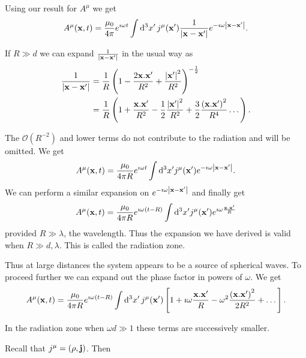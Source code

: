 \documentclass{notes}
\newcommand{\cO}{\mathcal{O}}
\newcommand{\jc}{\vect{j}}
\begin{document}
\vspace{1.5in}

Using our result for $A^\mu$ we get
\[
A^\mu(\mathbf{x},t) = \frac{\mu_0}{4 \pi} e^{\imath \omega t}
\int \mathrm{d}^3 x'\, j^\mu(\mathbf{x}') \frac{1}{\left|\mathbf{x} - \mathbf{x}'\right|}
e^{-\imath \omega \left|\mathbf{x}-\mathbf{x}'\right|}.
\]

If $R \gg d$ we can expand $\frac{1}{\left|\mathbf{x}-\mathbf{x}'\right|}$ in the
usual way as
\begin{align*}
\frac{1}{\left|\mathbf{x}-\mathbf{x}'\right|} &= \frac{1}{R}
\left( 1 - \frac{2 \mathbf{x}.\mathbf{x}'}{R^2}
+ \frac{\left|\mathbf{x}'\right|^2}{R^2} \right)^{-\frac{1}{2}} \\
&= \frac{1}{R} \left( 1 + \frac{\mathbf{x}.\mathbf{x}'}{R^2} - \frac{1}{2}
\frac{\left|\mathbf{x}'\right|^2}{R^2}
+ \frac{3}{2} \frac{\left(\mathbf{x}.\mathbf{x}' \right)^2}{R^4} \dots \right).
\end{align*}

The $\cO(R^{-2})$ and lower terms do not contribute to the radiation and will
be omitted.  We get
\[
A^\mu(\mathbf{x},t) = \frac{\mu_0}{4 \pi R} e^{\imath \omega t}
\int \mathrm{d}^3 x' j^\mu(\mathbf{x}') e^{-\imath \omega \left|\mathbf{x}
- \mathbf{x}'\right|}.
\]
We can perform a similar expansion on $e^{- \imath \omega \left|\mathbf{x}
- \mathbf{x}'\right|}$ and finally get
\[
A^\mu(\mathbf{x},t) = \frac{\mu_0}{4 \pi R} e^{\imath \omega
\left(t - R\right)} \int \mathrm{d}^3 x' j^\mu(\mathbf{x}') e^{\imath \omega
\frac{\mathbf{x}.\mathbf{x}'}{R}}
\]
provided $R \gg \lambda$, the wavelength.  Thus the expansion we
have derived is valid when $R \gg d, \lambda$.  This is called the radiation
zone.

Thus at large distances the system appears to be a source of spherical waves.
To proceed further we can expand out the phase factor in powers
of $\omega$.  We get
\[
A^\mu(\mathbf{x},t) = \frac{\mu_0}{4 \pi R} e^{\imath \omega \left( t - R
\right)} \int \mathrm{d}^3 x'\, j^\mu(\mathbf{x}')
\left[
1 + \imath \omega \frac{\mathbf{x}.\mathbf{x}'}{R} -
\omega^2 \frac{\left( \mathbf{x}.\mathbf{x}'\right)^2}{2 R^2} + \dots
\right].
\]

In the radiation zone when $\omega d \gg 1$ these terms are successively
smaller.

Recall that $j^\mu = (\rho,\jc)$.  Then
\end{document}
